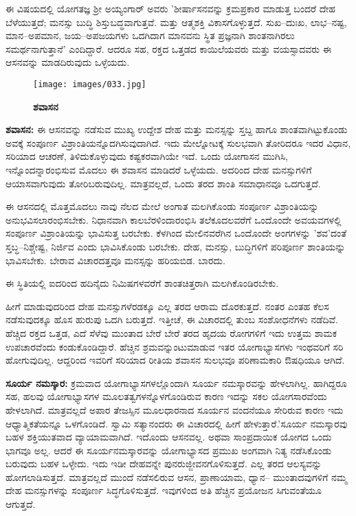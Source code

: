 ಈ ವಿಷಯದಲ್ಲಿ ಯೋಗತಜ್ಞ ಶ‍್ರೀ ಅಯ್ಯಂಗಾರ್ ಅವರು 'ಶೀರ್ಷಾಸನವನ್ನು ಕ್ರಮಪ್ರಕಾರ ಮಾಡುತ್ತ ಬಂದರೆ ದೇಹ ಬೆಳೆಯುತ್ತದೆ; ಮನಸ್ಸು ಬುದ್ಧಿ ಶಿಸ್ತುಬದ್ಧವಾಗುತ್ತವೆ. ಮತ್ತು ಆತ್ಮಶಕ್ತಿ ವಿಕಾಸಗೊಳ್ಳುತ್ತದೆ. ಸುಖ–ದುಃಖ, ಲಾಭ–ನಷ್ಟ, ಮಾನ–ಅಪಮಾನ, ಜಯ–ಅಪಜಯಗಳು ಒದಗಿದಾಗ ಮಾನವನು ಸ್ಥಿತ ಪ್ರಜ್ಞನಾಗಿ ಶಾಂತನಾಗಿರಲು ಸಮರ್ಥನಾಗುತ್ತಾನೆ' ಎಂದಿದ್ದಾರೆ. ಆದರೂ ಸಹ, ರಕ್ತದ ಒತ್ತಡದ ಕಾಯಿಲೆಯವರು ಮತ್ತು ವಯಸ್ಸಾದವರು ಈ ಆಸನವನ್ನು ಮಾಡದಿರುವುದು ಒಳ್ಳೆಯದು.

\begin{figure}
\texttt{[image: images/033.jpg]}
\caption{\textbf{ಶವಾಸನ} }
\end{figure}

\textbf{  ಶವಾಸನ:} ಈ ಆಸನವನ್ನು ನಡೆಸುವ ಮುಖ್ಯ ಉದ್ದೇಶ ದೇಹ ಮತ್ತು ಮನಸ್ಸನ್ನು ಸ್ತಬ್ದ ಹಾಗೂ ಶಾಂತವಾಗಿಟ್ಟುಕೊಂಡು ಅವಕ್ಕೆ ಸಂಪೂರ್ಣ ವಿಶ್ರಾಂತಿಯನ್ನೊದಗಿಸುವುದಾಗಿದೆ. ಇದು ಮೇಲ್ನೋಟಕ್ಕೆ ಸುಲಭವಾಗಿ ತೋರಿದರೂ ಇದರ ವಿಧಾನ, ಸರಿಯಾದ ಆಚರಣೆ, ತಿಳಿದುಕೊಳ್ಳುವುದು ಕಷ್ಟಕರವಾಗಿಯೇ ಇದೆ. ಒಂದು ಯೋಗಾಸನ ಮುಗಿಸಿ, ಇನ್ನೊಂದನ್ನಾರಂಭಿಸುವ ಮೊದಲು ಈ ಶವಾಸನ ಮಾಡಿದರೆ ಒಳ್ಳೆಯದು. ಅದರಿಂದ ದೇಹ ಮನಸ್ಸುಗಳಿಗೆ ಆಯಾಸವಾಗುವುದು ತೋರಿಬರುವುದಿಲ್ಲ. ಮಾತ್ರವಲ್ಲದೆ, ಒಂದು ತರದ ಶಾಂತಿ ಸಮಾಧಾನವೂ ಒದಗುತ್ತದೆ.

ಈ ಆಸನದಲ್ಲಿ ಮೊತ್ತಮೊದಲು ನಾವು ನೆಲದ ಮೇಲೆ ಅಂಗಾತ ಮಲಗಿಕೊಂಡು ಸಂಪೂರ್ಣ ವಿಶ್ರಾಂತಿಯನ್ನು ಅನುಭವಿಸಲಾರಂಭಿಸಬೇಕು. ನಿಧಾನವಾಗಿ ಕಾಲಬೆರಳಿಂದಾರಂಭಿಸಿ ತಲೆಕೂದಲವರೆಗೆ ಒಂದೊಂದೇ ಅವಯವಗಳಲ್ಲಿ ಸಂಪೂರ್ಣ ವಿಶ್ರಾಂತಿಯನ್ನು ಭಾವಿಸುತ್ತ ಬರಬೇಕು. ಕೆಳಗಿಂದ ಮೇಲಿನವರೆಗಿನ ಒಂದೊಂದೇ ಅಂಗಗಳನ್ನು 'ಶವ'ದಂತೆ ಸ್ತಬ್ಧ–ನಿಶ್ಚೇಷ್ಟ, ನಿರ್ಜಿವ ಎಂದು ಭಾವಿಸಿಕೊಂಡು ಬರಬೇಕು. ದೇಹ, ಮನಸ್ಸು, ಬುದ್ಧಿಗಳಿಗೆ ಪರಿಪೂರ್ಣ ಶಾಂತಿಯನ್ನು ಭಾವಿಸಬೇಕು. ಬೇರಾವ ವಿಚಾರದತ್ತವೂ ಮನಸ್ಸನ್ನು ಹರಿಯಬಿಡ. ಬಾರದು.

ಈ ಸ್ಥಿತಿಯಲ್ಲಿ ಐದರಿಂದ ಹದಿನೈದು ನಿಮಿಷಗಳವರೆಗೆ ಶಾಂತಚಿತ್ತರಾಗಿ ಮಲಗಿಕೊಂಡಿರಬೇಕು.

ಹೀಗೆ ಮಾಡುವುದರಿಂದ ದೇಹ ಮನಸ್ಸುಗಳೆರಡಕ್ಕೂ ಎಲ್ಲ ತರದ ಆರಾಮ ದೊರಕುತ್ತದೆ. ನಂತರ ಎಂತಹ ಕೆಲಸ ನಡೆಸುವುದಕ್ಕೂ ಹೊಸ ಹುರುಪು ಒದಗಿ ಬರುತ್ತದೆ. ಇತ್ತೀಚೆ, ಈ ವಿಚಾರದಲ್ಲಿ ತುಂಬ ಸಂಶೋಧನೆಗಳು ನಡೆದಿವೆ. ಹೆಚ್ಚಿದ ರಕ್ತದ ಒತ್ತಡ, ಎದೆ ಸೆಳೆವು ಮುಂತಾದ ಬೇರೆ ಬೇರೆ ತರದ ಹೃದಯ ರೋಗಗಳಿಗೆ ಇದು ಉತ್ತಮ ಶಾಮಕ ಉಪಚಾರವೆಂದು ಕಂಡುಕೊಂಡಿದ್ದಾರೆ. ಹೆಚ್ಚಿನ ಶ್ರಮವನ್ನುಂಟುಮಾಡುವ ಇತರ ಯೋಗಾಭ್ಯಾಸಗಳು ಇಂಥವರಿಗೆ ಸರಿ ಹೋಗುವುದಿಲ್ಲ. ಆದ್ದರಿಂದ ಇವರಿಗೆ ಸರಿಯಾದ ರೀತಿಯ ಶವಾಸನ ಸುಲಭವೂ ಪರಿಣಾಮಕಾರಿ ಔಷಧಿಯೂ ಆಗಿದೆ.

\textbf{  ಸೂರ್ಯ ನಮಸ್ಕಾರ:} ಕ್ರಮವಾದ ಯೋಗಾಭ್ಯಾಸಗಳಲ್ಲೊಂದಾಗಿ ಸೂರ್ಯ ನಮಸ್ಕಾರವನ್ನು ಹೇಳಲಾಗಿಲ್ಲ. ಹಾಗಿದ್ದರೂ ಸಹ, ಹಲವು ಯೋಗಾಭ್ಯಾಸಗಳ ಮೂಲತತ್ವಗಳನ್ನೊಳಗೊಂಡಿರುವ ಕಾರಣ ಇದನ್ನು ಸಕಲ ಯೋಗಸಾರವೆಂದು ಹೇಳಲಾಗಿದೆ. ಮಾತ್ರವಲ್ಲದೆ ಅಪಾರ ತೇಜಸ್ಸಿನ ಮೂಲಧಾರನಾದ ಸೂರ್ಯನ ವಂದನೆಯೂ ಸೇರಿರುವ ಕಾರಣ ಇದು ಆಧ್ಯಾತ್ಮಿಕತೆಯನ್ನೂ ಒಳಗೊಂಡಿದೆ. ಸ್ವಾಮಿ ಸತ್ಯಾನಂದರು ಈ ವಿಚಾರದಲ್ಲಿ ಹೀಗೆ ಹೇಳುತ್ತಾರೆ.'ಸೂರ್ಯ ನಮಸ್ಕಾರವು ಬಹಳ ಶಕ್ತಿಯುತವಾದ ವ್ಯಾಯಾಮವಾಗಿದೆ. ಇದೊಂದು ಆಸನವಲ್ಲ. ಅಥವಾ ಸಾಂಪ್ರದಾಯಿಕ ಯೋಗದ ಒಂದು ಭಾಗವೂ ಅಲ್ಲ. ಆದರೆ ಈ ಸೂರ್ಯನಮಸ್ಕಾರವನ್ನು ಯೋಗಾಭ್ಯಾಸದ ಪ್ರಮುಖ ಅಂಗವಾಗಿ ನಿತ್ಯ ನಡೆಸಿಕೊಂಡು ಬರುವುದು ಬಹಳ ಒಳ್ಳೇದು. ಇದು ಇಡೀ ದೇಹವನ್ನೇ ಪುನರುಜ್ಜೀವನಗೊಳಿಸುತ್ತದೆ. ಎಲ್ಲ ತರದ ಆಲಸ್ಯವನ್ನು ಹೋಗಲಾಡಿಸುತ್ತದೆ. ಮಾತ್ರವಲ್ಲದೆ ಮುಂದೆ ನಡೆಸಲಿರುವ ಆಸನ, ಪ್ರಾಣಾಯಾಮ, ಧ್ಯಾನ– ಮುಂತಾದವುಗಳಿಗೆ ನಮ್ಮ ದೇಹ ಮನಸ್ಸುಗಳನ್ನು ಸಂಪೂರ್ಣ ಸಿದ್ಧಗೊಳಿಸುತ್ತದೆ. ಇವುಗಳಿಂದ ಅತಿ ಹೆಚ್ಚಿನ ಪ್ರಯೋಜನ ಸಿಗುವಂತೆಯೂ ಆಗುತ್ತದೆ.

